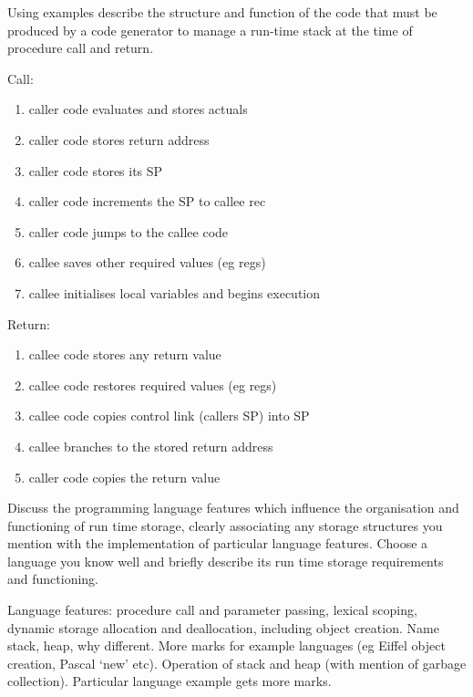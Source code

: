 \begin{questions}
\begin{subquestions}
Using examples describe the structure and function of the
code that must be produced by a code generator to manage a run-time
stack at the time of procedure call and return.
\begin{modelanswer}
Call:
\begin{enumerate}
\item caller code evaluates and stores actuals
\item caller code stores return address 
\item caller code stores its SP 
\item caller code increments the SP to callee rec
\item caller code jumps to the callee code
\item callee saves other required values (eg regs)
\item callee initialises local variables and begins execution 
\end{enumerate}
Return:
\begin{enumerate}
\item callee code stores any return value
\item callee code restores required values (eg regs)
\item callee code copies control link (callers SP) into SP
\item callee branches to the stored return address
\item caller code copies the return value 
\end{enumerate}
\end{modelanswer}

\subquestion
Discuss the programming language features which influence
the organisation and functioning of run time storage,
clearly associating any storage structures you
mention with the implementation of particular language features.
Choose a language you know well and briefly describe
its run time storage requirements and functioning.
\begin{modelanswer}
Language features: procedure call and parameter passing,
lexical scoping, dynamic storage allocation and deallocation,
including object creation. Name stack, heap, why different.
More marks for example languages
(eg Eiffel object creation, Pascal `new' etc). Operation of
stack and heap (with mention of garbage collection).
Particular language example gets more marks.
\end{modelanswer}



\end{subquestions}
\end{questions}
